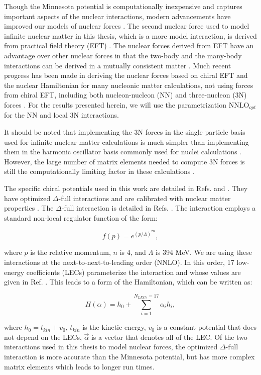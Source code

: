 Though the Minnesota potential is computationally inexpensive and captures important aspects of the nuclear interactions, modern advancements have improved our models of nuclear forces \cite{Ref20, Ref122, Ref43, Ref200, Ref201, Ref202, Ref203, Ref204, Ref123, Ref125,Ref129, Ref130, Ref131, Ref132, Ref133, Ref134, Ref138}. The second nuclear force used to model infinite nuclear matter in this thesis, which is a more model interaction, is derived from practical field theory (EFT) \cite{Ref3} \cite{Ref38, Ref16, Ref42, Ref43, Ref44, Ref45, Ref46, Ref47, Ref48, Ref49, Ref50, Ref200, Ref201}. The nuclear forces derived from EFT have an advantage over other nuclear forces in that the two-body and the many-body interactions can be derived in a mutually consistent matter \cite{Ref8}. Much recent progress has been made in deriving the nuclear forces based on chiral EFT and the nuclear Hamiltonian for many nucleonic matter calculations, not using forces from chiral EFT, including both nucleon-nucleon (NN) and three-nucleon (3N) forces \cite{Ref123, Ref129, Ref138, Ref139, Ref146, Ref122, Ref131}. For the results presented herein, we will use the parametrization NNLO$_{opt}$ for the NN and local 3N interactions.  

It should be noted that implementing the 3N forces in the single particle basis used for infinite nuclear matter calculations is much simpler than implementing them in the harmonic oscillator basis commonly used for nuclei calculations \cite{Ref9}. However, the large number of matrix elements needed to compute 3N forces is still the computationally limiting factor in these calculations \cite{Ref9}.

The specific chiral potentials used in this work are detailed in Refs. \cite{Ref200} and \cite{Ref201}.  They have optimized $\Delta$-full interactions and are calibrated with nuclear matter properties \cite{Ref200}. The $\Delta$-full interaction is detailed in Refs. \cite{Ref202, Ref203, Ref204, Ref205, Ref206, Ref207}.  The interaction employs a standard non-local regulator function of the form:

\begin{equation}
    f(p) = e^{(p/\Lambda)^{2n}},
\end{equation}

where $p$ is the relative momentum, $n$ is 4, and $\Lambda$ is 394 MeV. We are using these interactions at the next-to-next-to-leading order (NNLO). In this order, 17 low-energy coefficients (LECs) parameterize the interaction and whose values are given in Ref. \cite{Ref200}. This leads to a form of the Hamiltonian, which can be written as:

\begin{equation}
    H(\alpha) = h_0 + \sum_{i=1}^{N_{LECs}=17}\alpha_ih_i,
\end{equation}

where $h_0 = t_{kin} + v_0$,  $t_{kin}$ is the kinetic energy, $v_0$  is a constant potential that does not depend on the LECs, $\vec{\alpha}$ is a vector that denotes all of the LEC.  Of the two interactions used in this thesis to model nuclear forces, the optimized $\Delta$-full interaction is more accurate than the Minnesota potential, but has more complex matrix elements which leads to longer run times.